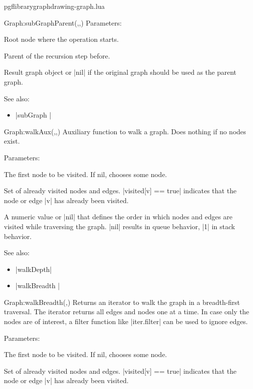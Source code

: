 \begin{filedescription}{pgflibrarygraphdrawing-graph.lua}
\begin{luacommand}{{Graph:subGraphParent}(,,)}
Parameters:
\begin{parameterdescription}
	\item[\meta{root}] Root node where the operation starts.\item[\meta{parent}] Parent of the recursion step before.\item[\meta{graph}] Result graph object or |nil| if the original graph should be used as the parent graph. 
\end{parameterdescription}



See also:
\begin{itemize}
	\item[] |subGraph |
\end{itemize}

\end{luacommand}\begin{luacommand}{{Graph:walkAux}(,,)}
Auxiliary function to walk a graph. Does nothing if no nodes exist. 

Parameters:
\begin{parameterdescription}
	\item[\meta{root}] The first node to be visited.  If nil, chooses some node.\item[\meta{visited}] Set of already visited nodes and edges. |visited[v] == true| indicates that the node or edge |v| has already been visited.\item[\meta{removeIndex}] A numeric value or |nil| that defines the order in which nodes and edges are visited while traversing the graph. |nil| results in queue behavior, |1| in stack behavior. 
\end{parameterdescription}



See also:
\begin{itemize}
	\item[] |walkDepth|\item[] |walkBreadth |
\end{itemize}

\end{luacommand}\begin{luacommand}{{Graph:walkBreadth}(,)}
Returns an iterator to walk the graph in a breadth-first traversal.  The iterator returns all edges and nodes one at a time. In case only the nodes are of interest, a filter function like |iter.filter| can be used to ignore edges. 

Parameters:
\begin{parameterdescription}
	\item[\meta{root}] The first node to be visited.  If nil, chooses some node.\item[\meta{visited}] Set of already visited nodes and edges. |visited[v] == true| indicates that the node or edge |v| has already been visited. 
\end{parameterdescription}




\end{luacommand}
\end{filedescription}
